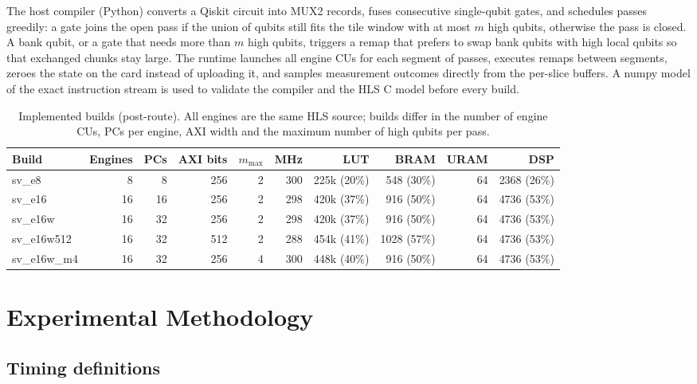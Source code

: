 \documentclass[pdflatex,sn-mathphys-num]{sn-jnl}
\theoremstyle{thmstyleone}
\theoremstyle{thmstylethree}
\begin{document}
The host compiler (Python) converts a Qiskit circuit into MUX2 records, fuses consecutive single-qubit gates, and schedules passes greedily: a gate joins the open pass if the union of qubits still fits the tile window with at most $m$ high qubits, otherwise the pass is closed. A bank qubit, or a gate that needs more than $m$ high qubits, triggers a remap that prefers to swap bank qubits with high local qubits so that exchanged chunks stay large. The runtime launches all engine CUs for each segment of passes, executes remaps between segments, zeroes the state on the card instead of uploading it, and samples measurement outcomes directly from the per-slice buffers. A numpy model of the exact instruction stream is used to validate the compiler and the HLS C model before every build.

\begin{table}
\centering
\caption{Implemented builds (post-route). All engines are the same HLS source; builds differ in the number of engine CUs, PCs per engine, AXI width and the maximum number of high qubits per pass.}\label{tab:builds}
\footnotesize\setlength{\tabcolsep}{3pt}
\begin{tabular}{lrrrrrrrrr}
\toprule
Build & Engines & PCs & AXI bits & $m_\mathrm{max}$ & MHz & LUT & BRAM & URAM & DSP \\
\midrule
sv\_e8 & 8 & 8 & 256 & 2 & 300 & 225k (20\%) & 548 (30\%) & 64 & 2368 (26\%) \\
sv\_e16 & 16 & 16 & 256 & 2 & 298 & 420k (37\%) & 916 (50\%) & 64 & 4736 (53\%) \\
sv\_e16w & 16 & 32 & 256 & 2 & 298 & 420k (37\%) & 916 (50\%) & 64 & 4736 (53\%) \\
sv\_e16w512 & 16 & 32 & 512 & 2 & 288 & 454k (41\%) & 1028 (57\%) & 64 & 4736 (53\%) \\
sv\_e16w\_m4 & 16 & 32 & 256 & 4 & 300 & 448k (40\%) & 916 (50\%) & 64 & 4736 (53\%) \\
\bottomrule
\end{tabular}
\end{table}
\section{Experimental Methodology}\label{sec:methodology}

\subsection{Timing definitions}\label{subsec:timing}
\end{document}
